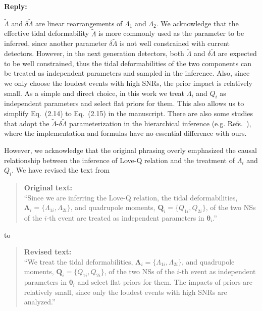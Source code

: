 \documentclass[11pt]{article}
\newenvironment{authorresponse}{
    \noindent \textbf{Reply:} \normalfont
}{
    \par\vspace{1.5em}
}
\newenvironment{originaltext}{
    \begin{quote}
    \color{oldcolor} \small \textbf{Original text:} \\
}{
    \end{quote}
}
\newenvironment{revisedtext}{
    \begin{quote}
    \color{revcolor} \small \textbf{Revised text:} \\
}{
    \end{quote}
}
\begin{document}
\begin{authorresponse}
	$\tilde{\Lambda}$ and $\delta \tilde{\Lambda}$ are linear rearrangements of $\Lambda_1$ and $\Lambda_2$.
    We acknowledge that the effective tidal
    deformability $\tilde{\Lambda}$ is more commonly used as the parameter to be
    inferred, since another parameter $\delta \tilde{\Lambda}$
     is not well constrained with current detectors.
    However, in the next generation detectors, both $\tilde{\Lambda}$ and
    $\delta \tilde{\Lambda}$ are expected to be well constrained, thus the
    tidal deformabilities of the two components can be treated as independent
    parameters and sampled in the inference. Also, since we only choose the
    loudest events with high SNRs, the prior impact is relatively small. As a
    simple and direct choice, in this work we treat $\Lambda_i$ and $Q_i$ as
    independent parameters and select flat priors for them. This also allows us
    to simplify Eq.~(2.14) to Eq.~(2.15) in the manuscript. There are also some
    studies that adopt the $\tilde{\Lambda}$-$\delta \tilde{\Lambda}$
    parameterization in the hierarchical inference (e.g. Refs.~\cite{Lackey:2014fwa, Wang:2024xon}), where the implementation and formulas have no essential difference with ours.

    However, we acknowledge that the original phrasing overly emphasized the causal relationship between the inference of Love-Q relation and the treatment of $\Lambda_i$ and $Q_i$. We have revised the text from
    \begin{originaltext}
        ``Since we are inferring the Love-Q relation, the tidal deformabilities, $\bm
        {\Lambda}_i=\{\Lambda_{1i},\Lambda_{2i}\}$, and quadrupole moments,
        $\bm{Q}_i=\{Q_ {1i},Q_{2i}\}$, of the two NSs of the $i\text{-th}$ event are
        treated as independent parameters in $\bm{\theta}_i$.'' 
    \end{originaltext}
    to
    \begin{revisedtext}
        ``We treat the tidal deformabilities, $\bm{\Lambda}_i=\{\Lambda_{1i},\Lambda_{2i}\}$, 
        and quadrupole moments, $\bm{Q}_i=\{Q_ {1i},Q_{2i}\}$, of the two NSs of the $i\text{-th}$ event 
        as independent parameters in $\bm{\theta}_i$ and select flat priors for
        them. The impacts of priors are relatively small, since only the loudest events with high SNRs are analyzed.''
    \end{revisedtext}

\end{authorresponse}
\end{document}
